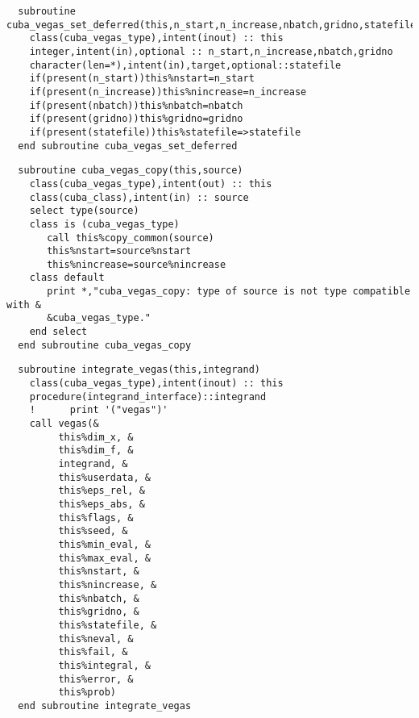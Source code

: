 \begin{Verbatim}
  subroutine cuba_vegas_set_deferred(this,n_start,n_increase,nbatch,gridno,statefile)
    class(cuba_vegas_type),intent(inout) :: this  
    integer,intent(in),optional :: n_start,n_increase,nbatch,gridno
    character(len=*),intent(in),target,optional::statefile
    if(present(n_start))this%nstart=n_start
    if(present(n_increase))this%nincrease=n_increase
    if(present(nbatch))this%nbatch=nbatch
    if(present(gridno))this%gridno=gridno
    if(present(statefile))this%statefile=>statefile
  end subroutine cuba_vegas_set_deferred
\end{Verbatim}

\begin{Verbatim}
  subroutine cuba_vegas_copy(this,source)
    class(cuba_vegas_type),intent(out) :: this
    class(cuba_class),intent(in) :: source
    select type(source)
    class is (cuba_vegas_type)
       call this%copy_common(source)
       this%nstart=source%nstart
       this%nincrease=source%nincrease
    class default
       print *,"cuba_vegas_copy: type of source is not type compatible with &
       &cuba_vegas_type."
    end select
  end subroutine cuba_vegas_copy
\end{Verbatim}

\begin{Verbatim}
  subroutine integrate_vegas(this,integrand)
    class(cuba_vegas_type),intent(inout) :: this
    procedure(integrand_interface)::integrand
    !      print '("vegas")'
    call vegas(&
         this%dim_x, &
         this%dim_f, &
         integrand, &
         this%userdata, &
         this%eps_rel, &
         this%eps_abs, &
         this%flags, &
         this%seed, &
         this%min_eval, &
         this%max_eval, &
         this%nstart, &
         this%nincrease, &
         this%nbatch, &
         this%gridno, &
         this%statefile, &
         this%neval, &
         this%fail, &
         this%integral, &
         this%error, &
         this%prob)
  end subroutine integrate_vegas
\end{Verbatim}

